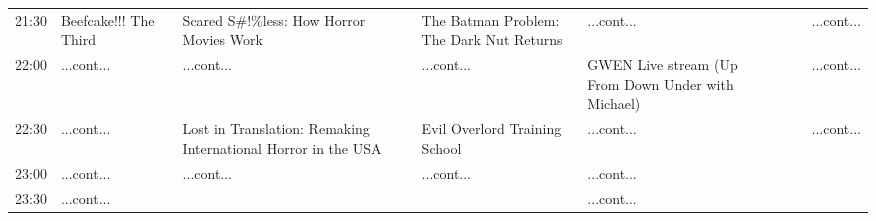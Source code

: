 \documentclass{scrreprt}
\begin{document}
\begin{landscape}
\begin{tabular}{c||p{25mm}|p{25mm}|p{25mm}|p{25mm}|p{25mm}|p{25mm}|p{25mm}|p{25mm}|p{25mm}|}
21:30&\cellcolor[gray]{0.557979} Beefcake!!! The Third&&\cellcolor[gray]{0.993241} Scared S\#!\%less: How Horror Movies Work&&\cellcolor[gray]{0.629315} The Batman Problem: The Dark Nut Returns&\cellcolor[gray]{0.759747} ...cont...&&&\cellcolor[gray]{0.645407} ...cont...\\
22:00&\cellcolor[gray]{0.557979} ...cont...&&\cellcolor[gray]{0.993241} ...cont...&&\cellcolor[gray]{0.629315} ...cont...&\cellcolor[gray]{0.871594} GWEN Live stream (Up From Down Under with Michael)&&&\cellcolor[gray]{0.645407} ...cont...\\
22:30&\cellcolor[gray]{0.557979} ...cont...&&\cellcolor[gray]{0.906400} Lost in Translation: Remaking International Horror in the USA&&\cellcolor[gray]{0.522301} Evil Overlord Training School&\cellcolor[gray]{0.871594} ...cont...&&&\cellcolor[gray]{0.645407} ...cont...\\
23:00&\cellcolor[gray]{0.557979} ...cont...&&\cellcolor[gray]{0.906400} ...cont...&&\cellcolor[gray]{0.522301} ...cont...&\cellcolor[gray]{0.871594} ...cont...&&&\\
23:30&\cellcolor[gray]{0.557979} ...cont...&&&&&\cellcolor[gray]{0.871594} ...cont...&&&\\\end{tabular}

\end{landscape}
\end{document}
